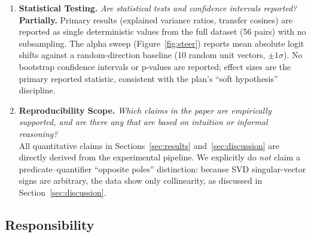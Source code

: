 \begin{enumerate}
\item \textbf{Statistical Testing.}
\textit{Are statistical tests and confidence intervals reported?} \\
\textbf{Partially.} Primary results (explained variance ratios, transfer cosines) are reported as single deterministic values from the full dataset (56 pairs) with no subsampling. The alpha sweep (Figure~\ref{fig:steer}) reports mean absolute logit shifts against a random-direction baseline (10 random unit vectors, $\pm 1\sigma$). No bootstrap confidence intervals or p-values are reported; effect sizes are the primary reported statistic, consistent with the plan's ``soft hypothesis'' discipline.

\item \textbf{Reproducibility Scope.}
\textit{Which claims in the paper are empirically supported, and are there any that are based on intuition or informal reasoning?} \\
All quantitative claims in Sections~\ref{sec:results} and~\ref{sec:discussion} are directly derived from the experimental pipeline. We explicitly do \emph{not} claim a predicate--quantifier ``opposite poles'' distinction: because SVD singular-vector signs are arbitrary, the data show only collinearity, as discussed in Section~\ref{sec:discussion}.

\end{enumerate}

\subsection*{Responsibility}

